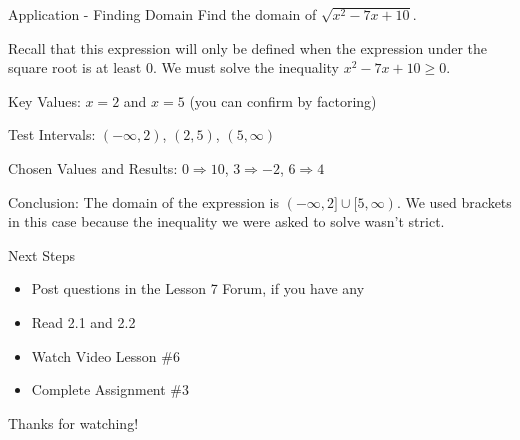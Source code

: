 \documentclass{beamer}
\begin{document}
\begin{frame}[t]{Application - Finding Domain}
Find the domain of $\sqrt{x^2 - 7x + 10}$.

\pause

Recall that this expression will only be defined when the expression under the square root is at least 0. We must solve the inequality $x^2 - 7x + 10 \geq 0$.

\pause

Key Values: $x = 2$ and $x = 5$ (you can confirm by factoring)

\pause

Test Intervals: $(-\infty, 2)$, $(2, 5)$, $(5, \infty)$

Chosen Values and Results: $0 \Rightarrow 10$, $3 \Rightarrow -2$, $6 \Rightarrow 4$

Conclusion: The domain of the expression is $(-\infty, 2] \cup [5, \infty)$. We used brackets in this case because the inequality we were asked to solve wasn't strict.
\end{frame}

\begin{frame}[t]{Next Steps}
\begin{itemize}
\item Post questions in the Lesson 7 Forum, if you have any
\item Read 2.1 and 2.2
\item Watch Video Lesson \#6
\item Complete Assignment \#3
\end{itemize}

\vfill

Thanks for watching!
\end{frame}
\end{document}
